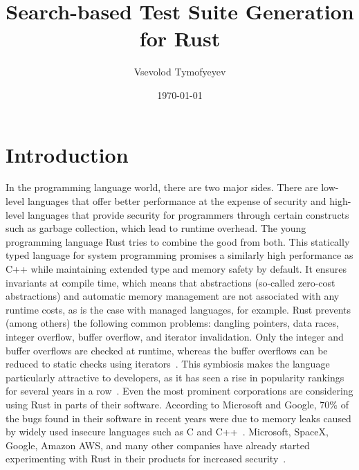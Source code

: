 \documentclass{article}
\begin{document}
\title{Search-based Test Suite Generation for Rust}
\author{Vsevolod Tymofyeyev}
\date{\today}
\maketitle

\tableofcontents
\newpage

\section{Introduction}
In the programming language world, there are two major sides. There are low-level languages that offer better performance at the expense of security and high-level languages that provide security for programmers through certain constructs such as garbage collection, which lead to runtime overhead. The young programming language Rust tries to combine the good from both. This statically typed language for system programming promises a similarly high performance as C++ while maintaining extended type and memory safety by default. It ensures invariants at compile time, which means that abstractions (so-called zero-cost abstractions) and automatic memory management are not associated with any runtime costs, as is the case with managed languages, for example. Rust prevents (among others) the following common problems: dangling pointers, data races, integer overflow, buffer overflow, and iterator invalidation. Only the integer and buffer overflows are checked at runtime, whereas the buffer overflows can be reduced to static checks using iterators~\cite{Anderson2016}. This symbiosis makes the language particularly attractive to developers, as it has seen a rise in popularity rankings for several years in a row~\cite{StackOverflow2020}. Even the most prominent corporations are considering using Rust in parts of their software. According to Microsoft and Google, 70\% of the bugs found in their software in recent years were due to memory leaks caused by widely used insecure languages such as C and C++~\cite{Microsoft2019MemoryBugs, RustInAndroid}. Microsoft, SpaceX, Google, Amazon AWS, and many other companies have already started experimenting with Rust in their products for increased security~\cite{MicrosoftJoinsRust, AmazonLovesRust, RustInAndroid, GoogleRustFoundation}.
\end{document}
